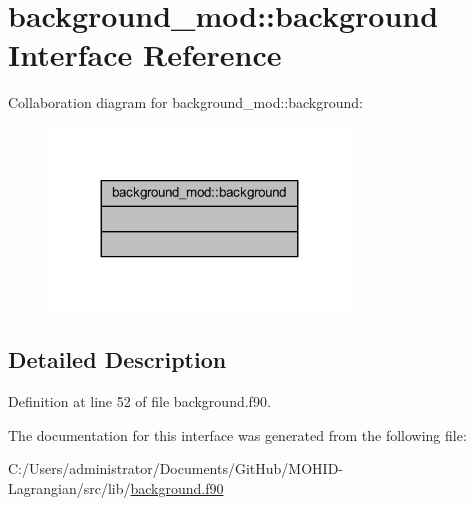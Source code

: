 \hypertarget{interfacebackground__mod_1_1background}{}\section{background\+\_\+mod\+:\+:background Interface Reference}
\label{interfacebackground__mod_1_1background}


Collaboration diagram for background\+\_\+mod\+:\+:background\+:
\nopagebreak
\begin{figure}[H]
\begin{center}
\leavevmode
\includegraphics[width=227pt]{interfacebackground__mod_1_1background__coll__graph}
\end{center}
\end{figure}


\subsection{Detailed Description}


Definition at line 52 of file background.\+f90.



The documentation for this interface was generated from the following file\+:\begin{DoxyCompactItemize}
\item 
C\+:/\+Users/administrator/\+Documents/\+Git\+Hub/\+M\+O\+H\+I\+D-\/\+Lagrangian/src/lib/\mbox{\hyperlink{background_8f90}{background.\+f90}}\end{DoxyCompactItemize}

